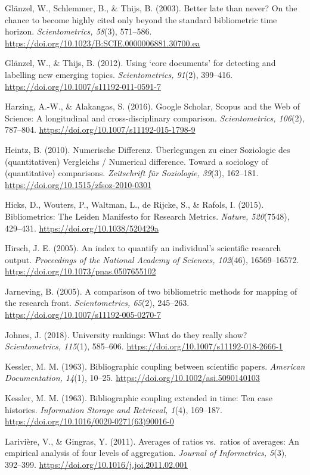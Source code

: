 \documentclass[
  letterpaper,
]{scrreprt}
\begin{document}
Glänzel, W., Schlemmer, B., \& Thijs, B. (2003). Better late than never?
On the chance to become highly cited only beyond the standard
bibliometric time horizon. \emph{Scientometrics, 58}(3), 571--586.
\url{https://doi.org/10.1023/B:SCIE.0000006881.30700.ea}

Glänzel, W., \& Thijs, B. (2012). Using `core documents' for detecting
and labelling new emerging topics. \emph{Scientometrics, 91}(2),
399--416. \url{https://doi.org/10.1007/s11192-011-0591-7}

Harzing, A.-W., \& Alakangas, S. (2016). Google Scholar, Scopus and the
Web of Science: A longitudinal and cross-disciplinary comparison.
\emph{Scientometrics, 106}(2), 787--804.
\url{https://doi.org/10.1007/s11192-015-1798-9}

Heintz, B. (2010). Numerische Differenz. Überlegungen zu einer
Soziologie des (quantitativen) Vergleichs / Numerical difference. Toward
a sociology of (quantitative) comparisons. \emph{Zeitschrift für
Soziologie, 39}(3), 162--181.
\url{https://doi.org/10.1515/zfsoz-2010-0301}

Hicks, D., Wouters, P., Waltman, L., de Rijcke, S., \& Rafols, I.
(2015). Bibliometrics: The Leiden Manifesto for Research Metrics.
\emph{Nature, 520}(7548), 429--431.
\url{https://doi.org/10.1038/520429a}

Hirsch, J. E. (2005). An index to quantify an individual's scientific
research output. \emph{Proceedings of the National Academy of Sciences,
102}(46), 16569--16572. \url{https://doi.org/10.1073/pnas.0507655102}

Jarneving, B. (2005). A comparison of two bibliometric methods for
mapping of the research front. \emph{Scientometrics, 65}(2), 245--263.
\url{https://doi.org/10.1007/s11192-005-0270-7}

Johnes, J. (2018). University rankings: What do they really show?
\emph{Scientometrics, 115}(1), 585--606.
\url{https://doi.org/10.1007/s11192-018-2666-1}

Kessler, M. M. (1963). Bibliographic coupling between scientific papers.
\emph{American Documentation, 14}(1), 10--25.
\url{https://doi.org/10.1002/asi.5090140103}

Kessler, M. M. (1963). Bibliographic coupling extended in time: Ten case
histories. \emph{Information Storage and Retrieval, 1}(4), 169--187.
\url{https://doi.org/10.1016/0020-0271(63)90016-0}

Larivière, V., \& Gingras, Y. (2011). Averages of ratios vs.~ratios of
averages: An empirical analysis of four levels of aggregation.
\emph{Journal of Informetrics, 5}(3), 392--399.
\url{https://doi.org/10.1016/j.joi.2011.02.001}
\end{document}
